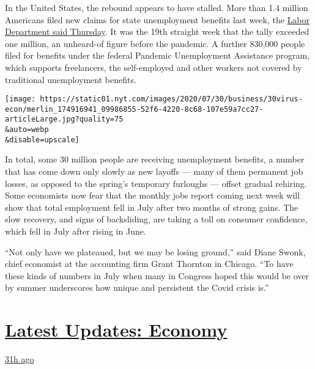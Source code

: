 In the United States, the rebound appears to have stalled. More than 1.4
million Americans filed new claims for state unemployment benefits last
week, the \href{https://oui.doleta.gov/press/2020/073020.pdf}{Labor
Department said Thursday}. It was the 19th straight week that the tally
exceeded one million, an unheard-of figure before the pandemic. A
further 830,000 people filed for benefits under the federal Pandemic
Unemployment Assistance program, which supports freelancers, the
self-employed and other workers not covered by traditional unemployment
benefits.

\texttt{[image: https://static01.nyt.com/images/2020/07/30/business/30virus-econ/merlin\_174916941\_09986855-52f6-4220-8c68-107e59a7cc27-articleLarge.jpg?quality=75\\\&auto=webp\\\&disable=upscale]}

In total, some 30 million people are receiving unemployment benefits, a
number that has come down only slowly as new layoffs --- many of them
permanent job losses, as opposed to the spring's temporary furloughs ---
offset gradual rehiring. Some economists now fear that the monthly jobs
report coming next week will show that total employment fell in July
after two months of strong gains. The slow recovery, and signs of
backsliding, are taking a toll on consumer confidence, which fell in
July after rising in June.

``Not only have we plateaued, but we may be losing ground,'' said Diane
Swonk, chief economist at the accounting firm Grant Thornton in Chicago.
``To have these kinds of numbers in July when many in Congress hoped
this would be over by summer underscores how unique and persistent the
Covid crisis is.''

\hypertarget{latest-updates-economy}{%
\section{\texorpdfstring{\href{https://www.nytimes.com/live/2020/07/31/business/stock-market-today-coronavirus?action=click\&pgtype=Article\&state=default\&region=MAIN_CONTENT_1\&context=storylines_live_updates}{Latest
Updates:
Economy}}{Latest Updates: Economy}}\label{latest-updates-economy}}

\href{https://www.nytimes.com/live/2020/07/31/business/stock-market-today-coronavirus?action=click\&pgtype=Article\&state=default\&region=MAIN_CONTENT_1\&context=storylines_live_updates\#kodaks-chief-executive-was-given-stock-options-then-the-share-price-spiked-1000-percent}{31h
ago}

